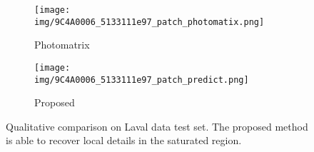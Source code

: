 \documentclass[journal]{IEEEtran}
\begin{document}
\begin{figure*}[h!]
        \begin{subfigure}[b]{0.24\textwidth}   
            \centering 
            \texttt{[image: img/9C4A0006\_5133111e97\_patch\_photomatix.png]}
            \caption[]%
            {{\small Photomatrix \cite{photomatrix} }}    
            \label{fig:mean and std of net34}
        \end{subfigure}
        \begin{subfigure}[b]{0.24\textwidth}   
            \centering 
            \texttt{[image: img/9C4A0006\_5133111e97\_patch\_predict.png]}
            \caption[]%
            {{\small Proposed}}    
            \label{fig:mean and std of net44}
        \end{subfigure}
        \caption{Qualitative comparison on Laval data test set. The proposed method is able to recover local details in the saturated region.}
        \label{fig:Laval_9C4A0006_5133111e97}
\end{figure*} 
\end{document}
